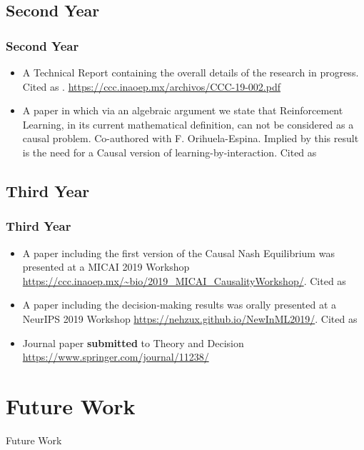 \documentclass{beamer}
\theoremstyle{plain}
\begin{document}
\subsection{Second Year}
\begin{frame}
\frametitle{Second Year}
\begin{itemize}
\item A Technical Report containing the overall details of the research in progress. Cited as \cite{gonzalez2019causal}. \url{https://ccc.inaoep.mx/archivos/CCC-19-002.pdf}
\item A paper in which via an algebraic argument we state that Reinforcement Learning, in its current mathematical definition, can not be considered as a causal problem. Co-authored with F. Orihuela-Espina. Implied by this result is the need for a Causal version of learning-by-interaction. Cited as \cite{gonzalez2019reinforcement}
\end{itemize}
\end{frame}

\subsection{Third Year}
\begin{frame}
\frametitle{Third Year}
\begin{itemize}
\item A paper including the first version of the Causal Nash Equilibrium was presented at a MICAI 2019 Workshop  \url{https://ccc.inaoep.mx/~bio/2019_MICAI_CausalityWorkshop/}. Cited as \cite{gonzalez2019games}
\item A paper including the decision-making results was orally presented at a NeurIPS 2019 Workshop  \url{https://nehzux.github.io/NewInML2019/}. Cited as \cite{gonzalez2019theorems}
\item Journal paper \textbf{submitted} to Theory and Decision  \url{https://www.springer.com/journal/11238/}
\end{itemize}
\end{frame}

\section{Future Work}
\begin{frame}
\begin{center}
\LARGE{Future Work}
\end{center}
\end{frame}
\end{document}
